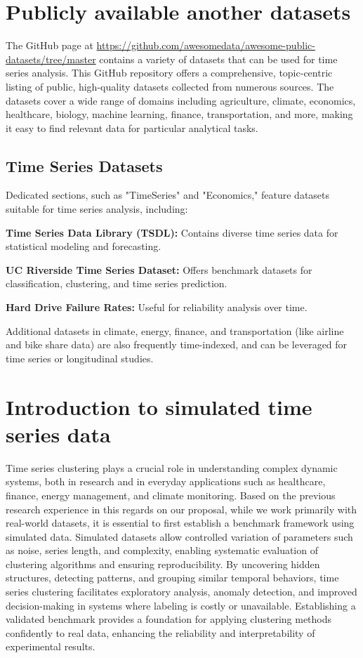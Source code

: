 \documentclass[12pt,a4paper]{article}
\begin{document}
\section{Publicly available another datasets}
The GitHub page at \url{https://github.com/awesomedata/awesome-public-datasets/tree/master} contains a variety of datasets that can be used for time series analysis. This GitHub repository offers a comprehensive, topic-centric listing of public, high-quality datasets collected from numerous sources. The datasets cover a wide range of domains including agriculture, climate, economics, healthcare, biology, machine learning, finance, transportation, and more, making it easy to find relevant data for particular analytical tasks.

\subsection{Time Series Datasets}
Dedicated sections, such as "TimeSeries" and "Economics," feature datasets suitable for time series analysis, including:

\textbf{Time Series Data Library (TSDL):} Contains diverse time series data for statistical modeling and forecasting.

\textbf{UC Riverside Time Series Dataset:} Offers benchmark datasets for classification, clustering, and time series prediction.

\textbf{Hard Drive Failure Rates:} Useful for reliability analysis over time.


Additional datasets in climate, energy, finance, and transportation (like airline and bike share data) are also frequently time-indexed, and can be leveraged for time series or longitudinal studies. 

\section{Introduction to simulated time series data}
Time series clustering plays a crucial role in understanding complex dynamic systems, both in research and in everyday applications such as healthcare, finance, energy management, and climate monitoring. Based on the previous research experience in this regards on our proposal, while we work primarily with real-world datasets, it is essential to first establish a benchmark framework using simulated data. Simulated datasets allow controlled variation of parameters such as noise, series length, and complexity, enabling systematic evaluation of clustering algorithms and ensuring reproducibility. By uncovering hidden structures, detecting patterns, and grouping similar temporal behaviors, time series clustering facilitates exploratory analysis, anomaly detection, and improved decision-making in systems where labeling is costly or unavailable. Establishing a validated benchmark provides a foundation for applying clustering methods confidently to real data, enhancing the reliability and interpretability of experimental results.
	
\end{document}
